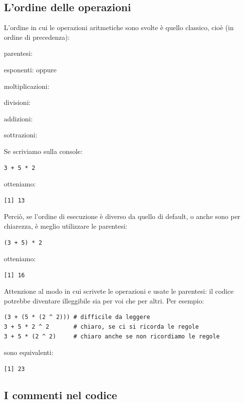\subsection{L'ordine delle operazioni}

L'ordine in cui le operazioni aritmetiche sono svolte \`e quello classico, cio\`e (in ordine di precedenza):

\begin{myenumerate}
	\item parentesi: \lsin{()}
	\item esponenti: \lsin{^} oppure \lsin{**}
	\item moltiplicazioni: \lsin{*}
	\item divisioni: \lsin{/}
	\item addizioni: \lsin{+}
	\item sottrazioni: \lsin{-}
\end{myenumerate}	

\noindent Se scriviamo sulla console:

\begin{lstlisting}[style=Rstyle]
3 + 5 * 2
\end{lstlisting}
%
otteniamo:

\begin{lstlisting}[style=Rstyle]
[1] 13
\end{lstlisting}
%
Perci\`o, se l'ordine di esecuzione \`e diverso da quello di default, o anche sono per chiarezza, \`e meglio utilizzare le parentesi:

\begin{lstlisting}[style=Rstyle]
(3 + 5) * 2
\end{lstlisting}
%
otteniamo:
\begin{lstlisting}[style=Rstyle]
[1] 16
\end{lstlisting}
%
Attenzione al modo in cui scrivete le operazioni e usate le parentesi: il codice potrebbe diventare illeggibile sia per voi che per altri. Per esempio:

\begin{lstlisting}[style=Rstyle]
(3 + (5 * (2 ^ 2))) # difficile da leggere
3 + 5 * 2 ^ 2       # chiaro, se ci si ricorda le regole
3 + 5 * (2 ^ 2)     # chiaro anche se non ricordiamo le regole
\end{lstlisting}
%
sono equivalenti:
\begin{lstlisting}[style=Rstyle]
[1] 23
\end{lstlisting}

\subsection{I commenti nel codice}

